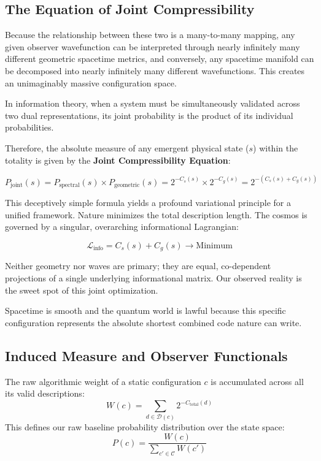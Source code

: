 \subsection*{The Equation of Joint Compressibility}

Because the relationship between these two is a many-to-many mapping, any given observer wavefunction can be interpreted through nearly infinitely many different geometric spacetime metrics, and conversely, any spacetime manifold can be decomposed into nearly infinitely many different wavefunctions.
This creates an unimaginably massive configuration space. 

In information theory, when a system must be simultaneously validated across two dual representations,
its joint probability is the product of its individual probabilities.

Therefore, the absolute measure of any emergent physical state ($s$) within the totality is given by the \textbf{Joint Compressibility Equation}:

\begin{equation}
P_{\text{joint}}(s) = P_{\text{spectral}}(s) \times P_{\text{geometric}}(s) = 2^{-C_s(s)} \times 2^{-C_g(s)} = 2^{-\left(C_s(s) + C_g(s)\right)}
\end{equation}

This deceptively simple formula yields a profound variational principle for a unified framework.
Nature minimizes the total description length.
The cosmos is governed by a singular, overarching informational Lagrangian:

\begin{equation}
\label{eq:lagrangian}
\mathcal{L}_{\text{info}} = C_s(s) + C_g(s) \longrightarrow \text{Minimum}
\end{equation}

Neither geometry nor waves are primary; they are equal, co-dependent projections of a single underlying informational matrix.
Our observed reality is the sweet spot of this joint optimization.

Spacetime is smooth and the quantum world is lawful because this specific configuration represents the absolute shortest combined code nature can write.



\subsection*{Induced Measure and Observer Functionals}

The raw algorithmic weight of a static configuration $c$ is accumulated across all its valid descriptions:
\[
W(c) = \sum_{d \in \mathcal{D}(c)} 2^{-C_{\text{total}}(d)}
\]
This defines our raw baseline probability distribution over the state space:
\[
P(c) = \frac{W(c)}{\sum_{c'\in\mathcal{C}} W(c')}
\]

